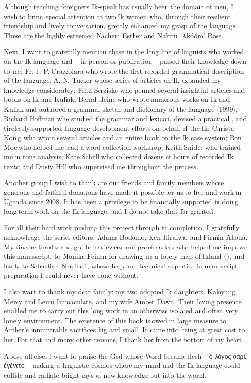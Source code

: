 Although teaching foreigners Ik-speak has usually been the domain of men, I wish to bring special attention to two Ik women who, through their resilient friendship and lively conversation, greatly enhanced my grasp of the language. These are the highly esteemed Nachem Esther and Nakiru ‘Akóóro’ Rose.

Next, I want to gratefully mention those in the long line of linguists who worked on the Ik language and – in person or publication – passed their knowledge down to me: Fr. J. P. Crazzolara who wrote the first recorded grammatical description of the language; A. N. Tucker whose series of articles on Ik expanded my knowledge considerably; Fritz Serzisko who penned several insightful articles and books on Ik and Kuliak; Bernd Heine who wrote numerous works on Ik and Kuliak and authored a grammar sketch and dictionary of the language (1999); Richard Hoffman who studied the grammar and lexicon, devised a practical , and tirelessly supported language development efforts on behalf of the Ik; Christa K\"{o}nig who wrote several articles and an entire book on the Ik case system; Ron Moe who helped me lead a word-collection workshop; Keith Snider who trained me in tone analysis; Kate Schell who collected dozens of hours of recorded Ik texts; and Dusty Hill who supervised me throughout the process.

Another group I wish to thank are our friends and family members whose generous and faithful donations have made it possible for us to live and work in Uganda since 2008. It has been a privilege to be financially supported in doing long-term work on the Ik language, and I do not take that for granted. 

For all their hard work pushing this project through to completion, I gratefully acknowledge the series editors: Adams Bodomo, Ken Hiraiwa, and Firmin Ahoua. My sincere thanks also go the reviewers and proofreaders who helped me improve this manuscript, to Monika Feinen for drawing up a lovely map of Ikland (), and lastly to Sebastian Nordhoff, whose  help and technical expertise in manuscript preparation I could never have done without.

I also want to thank my dear family: my two adopted Ik daughters, Kalo\-yang Mercy and Lemu Immaculate, and my wife Amber Dawn. Their loving presence enabled me to carry out this long work in an otherwise isolated and often very lonely environment. The existence of this book is owed in large measure to Amber’s innumerable sacrifices big and small. It came into being at great cost to her. For that and many other reasons, I thank her from the bottom of my heart.

Above all else, I want to praise the God whose Word became flesh
-- ὁ λόγος σὰρξ ἐγένετο --
making a linguistic cosmos where my mind and the Ik language could collide and radiate bright rays of new knowledge out into the world.
